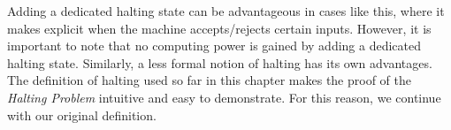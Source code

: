 \documentclass[../../../include/open-logic-section]{subfiles}
\begin{document}
\begin{explain}
Adding a dedicated halting state can be advantageous in cases like
this, where it makes explicit when the machine accepts/rejects certain
inputs.  However, it is important to note that no computing power is
gained by adding a dedicated halting state. Similarly, a less
formal notion of halting has its own advantages. The definition of
halting used so far in this chapter makes the proof of the
\emph{Halting Problem} intuitive and easy to demonstrate. For this
reason, we continue with our original definition.
\end{explain}
\end{document}
